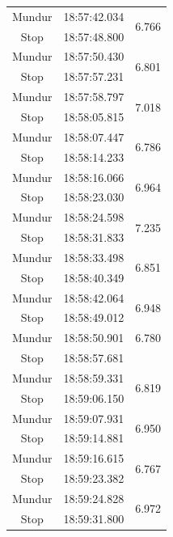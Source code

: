 \begin{longtable}{|c|c|c|}
  Mundur & 18:57:42.034 & \multirow{2}{*}{6.766} \\ \cline{1-2}
  Stop   & 18:57:48.800 &                        \\ \hline
  Mundur & 18:57:50.430 & \multirow{2}{*}{6.801} \\ \cline{1-2}
  Stop   & 18:57:57.231 &                        \\ \hline
  Mundur & 18:57:58.797 & \multirow{2}{*}{7.018} \\ \cline{1-2}
  Stop   & 18:58:05.815 &                        \\ \hline
  Mundur & 18:58:07.447 & \multirow{2}{*}{6.786} \\ \cline{1-2}
  Stop   & 18:58:14.233 &                        \\ \hline
  Mundur & 18:58:16.066 & \multirow{2}{*}{6.964} \\ \cline{1-2}
  Stop   & 18:58:23.030 &                        \\ \hline
  Mundur & 18:58:24.598 & \multirow{2}{*}{7.235} \\ \cline{1-2}
  Stop   & 18:58:31.833 &                        \\ \hline
  Mundur & 18:58:33.498 & \multirow{2}{*}{6.851} \\ \cline{1-2}
  Stop   & 18:58:40.349 &                        \\ \hline
  Mundur & 18:58:42.064 & \multirow{2}{*}{6.948} \\ \cline{1-2}
  Stop   & 18:58:49.012 &                        \\ \hline
  Mundur & 18:58:50.901 & 6.780 \\ \hline
  Stop   & 18:58:57.681 &                        \\ \hline
  Mundur & 18:58:59.331 & \multirow{2}{*}{6.819} \\ \cline{1-2}
  Stop   & 18:59:06.150 &                        \\ \hline
  Mundur & 18:59:07.931 & \multirow{2}{*}{6.950} \\ \cline{1-2}
  Stop   & 18:59:14.881 &                        \\ \hline
  Mundur & 18:59:16.615 & \multirow{2}{*}{6.767} \\ \cline{1-2}
  Stop   & 18:59:23.382 &                        \\ \hline
  Mundur & 18:59:24.828 & \multirow{2}{*}{6.972} \\ \cline{1-2}
  Stop   & 18:59:31.800 &                        \\ \hline

\end{longtable}
